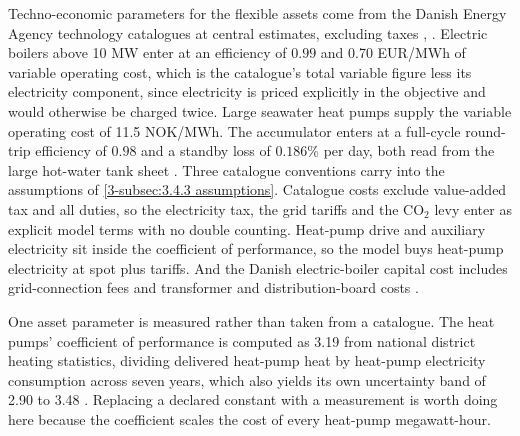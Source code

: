 Techno-economic parameters for the flexible assets come from the Danish Energy Agency technology catalogues at central estimates, excluding taxes \cite{danish_energy_agency_technology_2024}, \cite{danish_energy_agency_energy_2025}. Electric boilers above 10 MW enter at an efficiency of $0.99$ and 0.70 EUR/MWh of variable operating cost, which is the catalogue's total variable figure less its electricity component, since electricity is priced explicitly in the objective and would otherwise be charged twice. Large seawater heat pumps supply the variable operating cost of 11.5 NOK/MWh. The accumulator enters at a full-cycle round-trip efficiency of $0.98$ and a standby loss of $0.186\%$ per day, both read from the large hot-water tank sheet \cite{danish_energy_agency_energy_2025}. Three catalogue conventions carry into the assumptions of \autoref{3-subsec:3.4.3 assumptions}. Catalogue costs exclude value-added tax and all duties, so the electricity tax, the grid tariffs and the CO$_2$ levy enter as explicit model terms with no double counting. Heat-pump drive and auxiliary electricity sit inside the coefficient of performance, so the model buys heat-pump electricity at spot plus tariffs. And the Danish electric-boiler capital cost includes grid-connection fees and transformer and distribution-board costs \cite{danish_energy_agency_technology_2024}.

One asset parameter is measured rather than taken from a catalogue. The heat pumps' coefficient of performance is computed as 3.19 from national district heating statistics, dividing delivered heat-pump heat by heat-pump electricity consumption across seven years, which also yields its own uncertainty band of 2.90 to 3.48 \cite{statistisk_sentralbyra_statbank_nodate}. Replacing a declared constant with a measurement is worth doing here because the coefficient scales the cost of every heat-pump megawatt-hour.

